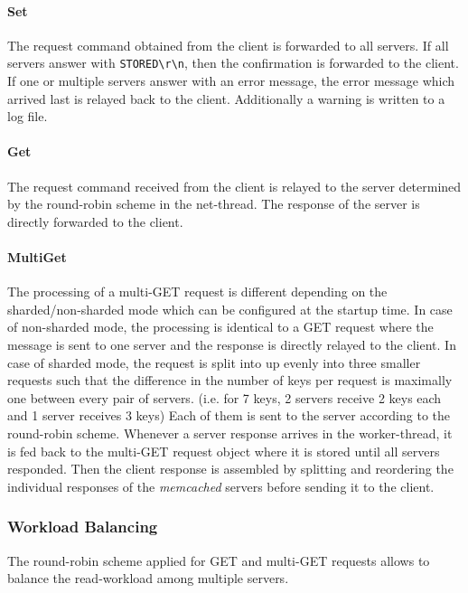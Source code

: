 \documentclass[report.tex]{subfiles}
\begin{document}
\paragraph{Set} The request command obtained from the client is forwarded to all servers. If all servers answer with \texttt{STORED\textbackslash r\textbackslash n}, then the confirmation is forwarded to the client. 
If one or multiple servers answer with an error message, the error message which arrived last is relayed back to the client. 
Additionally a warning is written to a log file.

\paragraph{Get} The request command received from the client is relayed to the server determined by the round-robin scheme in the net-thread.
The response of the server is directly forwarded to the client.

\paragraph{MultiGet} The processing of a multi-GET request is different depending on the sharded/non-sharded mode which can be configured at the startup time. In case of non-sharded mode, the processing is identical to a GET request where the message is sent to one server and the response is directly relayed to the client. In case of sharded mode, the request is split into up evenly into three smaller requests such that the difference in the number of keys per request is maximally one between every pair of servers. (i.e. for 7 keys, 2 servers receive 2 keys each and 1 server receives 3 keys)
Each of them is sent to the server according to the round-robin scheme. Whenever a server response arrives in the worker-thread, it is fed back to the multi-GET request object where it is stored until all servers responded. Then the client response is assembled by splitting and reordering the individual responses of the \emph{memcached} servers before sending it to the client.
 


\subsubsection{Workload Balancing}\label{workload-balancing}
The round-robin scheme applied for GET and multi-GET requests allows to balance the read-workload among multiple servers.
\end{document}
